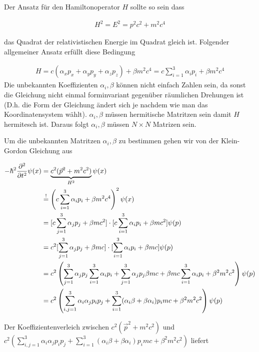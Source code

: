 Der Ansatz für den Hamiltonoperator \(H\) sollte so sein dass

\begin{align}
  \label{eq:4}
  H^2 = E^2 = p^2c^2+ m^2c^4
\end{align}

das Quadrat der relativistischen Energie im Quadrat gleich ist. Folgender allgemeiner Ansatz erfüllt diese Bedingung

\begin{align}
  \label{eq:5}
  H = c (\alpha_x p_x + \alpha_y p_y + \alpha_z p_z) + \beta m^2c^4 = c\sum_{i=1}^3\alpha_i p_i   + \beta m^2c^4
\end{align}
Die unbekannten Koeffizienten \(\alpha_i,\beta\) können nicht einfach Zahlen sein, da sonst die Gleichung nicht einmal forminvariant gegenüber räumlichen Drehungen ist (D.h. die Form der Gleichung ändert sich je nachdem wie man das Koordinatensystem wählt). \(\alpha_i,\beta\) müssen hermitische Matritzen sein damit \(H\) hermitesch ist. Daraus folgt  \(\alpha_i,\beta\) müssen \(N\times N\) Matrizen sein.

Um die unbekannten Matritzen  \(\alpha_i,\beta\) zu bestimmen gehen wir von der Klein-Gordon Gleichung aus

\begin{align}
  \label{eq:6}
  -\hbar^2 \pdiff^2_t \psi(x) &= \underbrace{c^2(\vec p^2 + m^2c^2)}_{H^2}\psi(x)\\
 &\stackrel{!}= \left(  c\sum_{i=1}^3\alpha_i p_i   + \beta m^2c^4 \right)^2\psi(x)\\
&=[c \sum_{j=1}^3 \alpha_jp_j+\beta mc^2] \cdot [c \sum_{i=1}^3 \alpha_ip_i+\beta mc^2]\psi(p) \\
&=c^2 [ \sum_{j=1}^3 \alpha_jp_j+\beta mc] \cdot [ \sum_{i=1}^3 \alpha_ip_i+\beta mc]\psi(p) \\
&=c^2 \left( \sum_{j=1}^3 \alpha_jp_j\sum_{i=1}^3 \alpha_ip_i  +   \sum_{j=1}^3 \alpha_jp_j \beta mc  + \beta mc \sum_{i=1}^3 \alpha_ip_i+ \beta^2 m^2c^2\right)\psi(p) \\
&= c^2\left(\sum_{i,j=1}^3\alpha_i\alpha_j p_ip_j+\sum_{i=1}^3(\alpha_i\beta+\beta\alpha_i)p_i mc +  \beta^2m^2c^2\right)\psi(p)
\end{align}

Der Koeffizientenverleich zwischen \(c^2(\vec p^2 + m^2c^2)\) und \( c^2\left(\sum_{i,j=1}^3\alpha_i\alpha_j p_ip_j+\sum_{i=1}^3(\alpha_i\beta+\beta\alpha_i)p_i mc +  \beta^2m^2c^2\right)\) liefert



